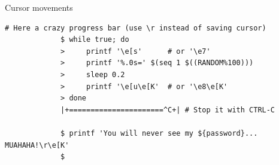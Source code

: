 \begin{frame}[fragile]{Cursor movements}
\begin{onlyenv}
\begin{lstlisting}[style=MyBash, numbers=none, xleftmargin=3mm, xrightmargin=3mm]
             # Here a crazy progress bar (use \r instead of saving cursor)
             $ while true; do
             >     printf '\e[s'      # or '\e7'
             >     printf '%.0s=' $(seq 1 $((RANDOM%100)))
             >     sleep 0.2
             >     printf '\e[u\e[K'  # or '\e8\e[K'
             > done
             |+======================^C+| # Stop it with CTRL-C

             $ printf 'You will never see my ${password}... MUAHAHA!\r\e[K'
             $
        \end{lstlisting}
    \end{onlyenv}
    \PrepareURLsymbol[PB]
\end{frame}

